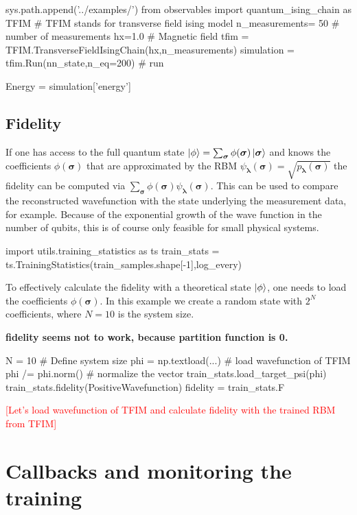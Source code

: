 \documentclass[submission, Phys]{SciPost}
\begin{document}
\begin{python}
sys.path.append('../examples/')
from observables import quantum_ising_chain as TFIM
# TFIM stands for transverse field ising model
n_measurements= 50 # number of measurements
hx=1.0             # Magnetic field
tfim = TFIM.TransverseFieldIsingChain(hx,n_measurements)
simulation = tfim.Run(nn_state,n_eq=200) # run 

Energy = simulation['energy']
\end{python}

\subsection{Fidelity}

If one has access to the full quantum state $\ket{\phi} = \sum_{\bm{\sigma}} \phi(\bm{\sigma}) \ket{ \bm{\sigma}}$ and knows the coefficients $\phi(\bm{\sigma})$ that are approximated by the RBM $\psi_{\bm{\lambda}}(\bm{\sigma}) = \sqrt{p_{\bm{\lambda}}(\bm{\sigma})}$ the fidelity can be computed via $\sum_{\bm{\sigma}} \phi(\bm{\sigma}) \psi_{\bm{\lambda}}(\bm{\sigma})$. This can be used to compare the reconstructed wavefunction with the state underlying the measurement data, for example.
Because of the exponential growth of the wave function in the number of qubits, this is of course only feasible for small physical systems.
\begin{python}
import utils.training_statistics as ts
train_stats = ts.TrainingStatistics(train_samples.shape[-1],log_every)
\end{python}
To effectively calculate the fidelity with a theoretical state $\ket{\phi}$, one needs to load the coefficients $\phi(\bm{\sigma})$. In this example we create a random state with $2^N$ coefficients, where $N=10$ is the system size.

\textbf{fidelity seems not to work, because partition function is 0.}

\begin{python}
N = 10 # Define system size
phi =  np.textload(...) # load wavefunction of TFIM
phi /= phi.norm() # normalize the vector
train_stats.load_target_psi(phi)
train_stats.fidelity(PositiveWavefunction)
fidelity = train_stats.F
\end{python}

\textcolor{red}{[Let's load wavefunction of TFIM and calculate fidelity with the trained RBM from TFIM]}

\section{Callbacks and monitoring the training}
\label{Callbacks}
\end{document}
